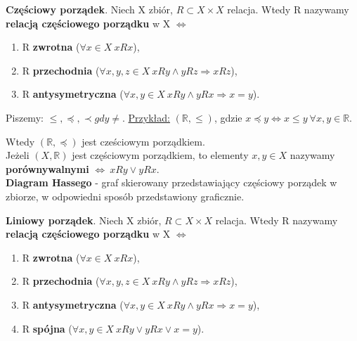 \documentclass[12pt]{article}
\begin{document}
    \begin{definition}
        \textbf{Częściowy porządek}. Niech X zbiór, $R \subset X \times X$ relacja. Wtedy R nazywamy \textbf{relacją częściowego porządku} w X
        $\Leftrightarrow$
        \begin{enumerate}
            \item R \textbf{zwrotna} ($\forall x \in X ~ xRx$),
            \item R \textbf{przechodnia} ($\forall x,y,z \in X ~ xRy \wedge yRz \Rightarrow xRz$),
            \item R \textbf{antysymetryczna} ($\forall x,y \in X ~ xRy \wedge yRx \Rightarrow x = y$).
        \end{enumerate}
        Piszemy: $\leqslant, \preceq, \prec gdy \neq$. \underline{Przykład:} $(\mathbb{R}, \leq)$, gdzie $x \preceq y \Leftrightarrow x \leq y ~ \forall x,y \in \mathbb{R}$.

        Wtedy $(\mathbb{R}, \preceq)$ jest cześciowym porządkiem.\\

        Jeżeli $(X, \mathbb{R})$ jest częściowym porządkiem, to elementy $x, y \in X$ nazywamy  \textbf{porównywalnymi}
        $\Leftrightarrow ~ xRy  \vee yRx$.\\

        \textbf{Diagram Hassego} - graf skierowany przedstawiający częściowy porządek w zbiorze, w odpowiedni sposób
        przedstawiony graficznie.
    \end{definition}

    \begin{definition}
        \textbf{Liniowy porządek}. Niech X zbiór, $R \subset X \times X$ relacja. Wtedy R nazywamy \textbf{relacją częściowego porządku} w X
        $\Leftrightarrow$
        \begin{enumerate}
            \item R \textbf{zwrotna} ($\forall x \in X ~ xRx$),
            \item R \textbf{przechodnia} ($\forall x,y,z \in X ~ xRy \wedge yRz \Rightarrow xRz$),
            \item R \textbf{antysymetryczna} ($\forall x,y \in X ~ xRy \wedge yRx \Rightarrow x = y$),
            \item R \textbf{spójna} ($\forall x,y \in X ~ xRy \vee yRx \vee x = y$).
        \end{enumerate}
    \end{definition}
\end{document}
